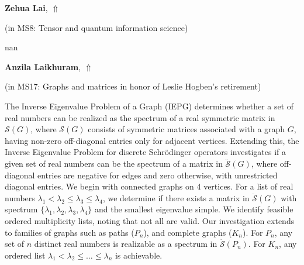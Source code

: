 \documentclass[ILAS2025-program.tex]{subfiles}
\begin{document}
\hypertarget{down0285}{}\begin{ilasabstract}
    
\textbf{Zehua Lai},  \hfill \hyperlink{up0285}{$\Uparrow$}
    
    
(in {\color{mstitle}MS8: Tensor and quantum information science})
        
\mtskip
    nan
\end{ilasabstract}
    

\hypertarget{down0223}{}\begin{ilasabstract}
    
\textbf{Anzila Laikhuram},  \hfill \hyperlink{up0223}{$\Uparrow$}
    
    
(in {\color{mstitle}MS17: Graphs and matrices in honor of Leslie Hogben's retirement})
        
\mtskip
    The Inverse Eigenvalue Problem of a Graph (IEPG) determines whether a set of real numbers can be realized as the spectrum of a real symmetric matrix in $\mathcal{S}(G)$, where $\mathcal{S}(G)$ consists of symmetric matrices associated with a graph $G$, having non-zero off-diagonal entries only for adjacent vertices. Extending this, the Inverse Eigenvalue Problem for discrete Schr\"odinger operators investigates if a given set of real numbers can be the spectrum of a matrix in $\ddot{\mathcal{S}}(G)$, where off-diagonal entries are negative for edges and zero otherwise, with unrestricted diagonal entries. We begin with connected graphs on 4 vertices. For a list of real numbers $\lambda_1 < \lambda_2 \leq \lambda_3 \leq \lambda_4$, we determine if there exists a matrix in $\ddot{\mathcal{S}}(G)$ with spectrum $\{\lambda_1, \lambda_2, \lambda_3, \lambda_4\}$ and the smallest eigenvalue simple. We identify feasible ordered multiplicity lists, noting that not all are valid.   Our investigation extends to families of graphs such as paths ($P_n$), and complete graphs ($K_n$). For $P_n$, any set of $n$ distinct real numbers is realizable as a spectrum in $\ddot{\mathcal{S}}(P_n)$. For $K_n$, any ordered list $\lambda_1 < \lambda_2 \leq \dots \leq \lambda_n$ is achievable. 
\end{ilasabstract}
    
\end{document}
